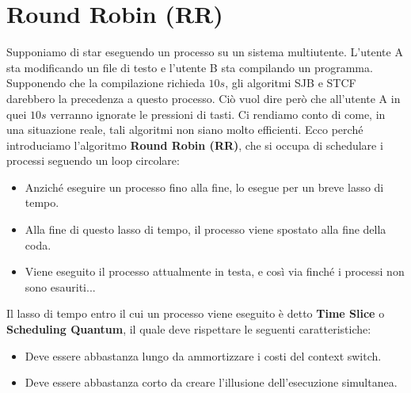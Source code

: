 \documentclass[12pt]{report}
\begin{document}
	\section{Round Robin (RR)}
	Supponiamo di star eseguendo un processo su un sistema multiutente. L'utente A sta modificando un file di testo e l'utente B sta compilando un programma.\\
	Supponendo che la compilazione richieda $10s$, gli algoritmi SJB e STCF darebbero la precedenza a questo processo. Ciò vuol dire però che all'utente A in quei $10s$ verranno ignorate le pressioni di tasti. Ci rendiamo conto di come, in una situazione reale, tali algoritmi non siano molto efficienti.
	\smallbreak
	Ecco perché introduciamo l'algoritmo \textbf{Round Robin (RR)}, che si occupa di schedulare i processi seguendo un loop circolare:
	\begin{itemize}
		\item Anziché eseguire un processo fino alla fine, lo esegue per un breve lasso di tempo.
		
		\item Alla fine di questo lasso di tempo, il processo viene spostato alla fine della coda.
		
		\item Viene eseguito il processo attualmente in testa, e così via finché i processi non sono esauriti...
	\end{itemize}
	Il lasso di tempo entro il cui un processo viene eseguito è detto \textbf{Time Slice} o \textbf{Scheduling Quantum}, il quale deve rispettare le seguenti caratteristiche:
	\begin{itemize}
		\item Deve essere abbastanza lungo da ammortizzare i costi del context switch.
		
		\item Deve essere abbastanza corto da creare l'illusione dell'esecuzione simultanea.
	\end{itemize}
	
\end{document}
